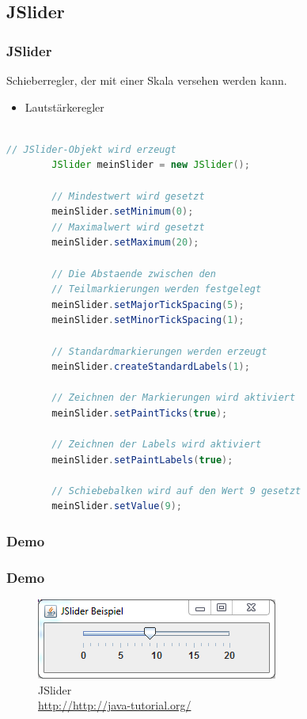 \documentclass[xcolor=dvipsnames]{beamer}
\begin{document}
\subsection{JSlider}
\begin{frame}  %
  \frametitle{JSlider
} %
  \begin{block}{Schieberregler, der mit einer Skala versehen werden kann.}
	  \begin{itemize}
		\item Lautstärkeregler
	  \end{itemize}
  \end{block}

\begin{lstlisting}[language=java,basicstyle=\scriptsize\ttfamily]

// JSlider-Objekt wird erzeugt
		JSlider meinSlider = new JSlider();
 
		// Mindestwert wird gesetzt
		meinSlider.setMinimum(0);
		// Maximalwert wird gesetzt
		meinSlider.setMaximum(20);
 
		// Die Abstaende zwischen den 
		// Teilmarkierungen werden festgelegt
		meinSlider.setMajorTickSpacing(5);
		meinSlider.setMinorTickSpacing(1);
 
		// Standardmarkierungen werden erzeugt 
		meinSlider.createStandardLabels(1);
 
		// Zeichnen der Markierungen wird aktiviert
		meinSlider.setPaintTicks(true);
 
		// Zeichnen der Labels wird aktiviert
		meinSlider.setPaintLabels(true);
 
		// Schiebebalken wird auf den Wert 9 gesetzt
		meinSlider.setValue(9);

\end{lstlisting}

\end{frame}

\subsubsection{Demo}
\begin{frame}
  \frametitle{Demo}
	\begin{figure}
		\includegraphics[scale=1.0]{images/jslider.PNG}
		\caption{JSlider \\ \tiny{\textcolor{gray}{\url{http://http://java-tutorial.org/}}}}
		\end{figure}
\end{frame}
\end{document}
